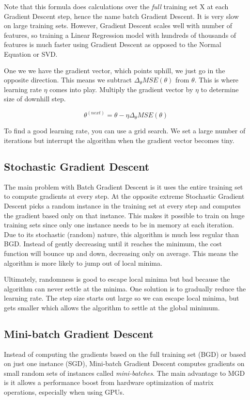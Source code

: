 \documentclass[letterpaper]{article}
\begin{document}
Note that this formula does calculations over the \textsl{full} training set X at each Gradient Descent step, hence the name batch Gradient Descent. It is very slow on large training sets. However, Gradient Descent scales well with number of features, so training a Linear Regression model with hundreds of thousands of features is much faster using Gradient Descent as opposed to the Normal Equation or SVD. 

One we we have the gradient vector, which points uphill, we just go in the opposite direction. This means we subtract $\Delta_{\theta} MSE (\theta)$ from $\theta$. This is where learning rate $\eta$ comes into play. Multiply the gradient vector by $\eta$ to determine size of downhill step. 

$$\theta^{(next)} = \theta - \eta\Delta_{\theta}MSE(\theta)$$ 

To find a good learning rate, you can use a grid search. We set a large number of iterations but interrupt the algorithm when the gradient vector becomes tiny. 

\subsection{Stochastic Gradient Descent}
The main problem with Batch Gradient Descent is it uses the entire training set to compute gradients at every step. At the opposite extreme Stochastic Gradient Descent picks a random instance in the training set at every step and computes the gradient based only on that instance. This makes it possible to train on huge training sets since only one instance needs to be in memory at each iteration. Due to its stochastic (random) nature, this algorithm is much less regular than BGD. Instead of gently decreasing until it reaches the minimum, the cost function will bounce up and down, decreasing only on average. This means the algorithm is more likely to jump out of local minima. 

Ultimately, randomness is good to escape local minima but bad because the algorithm can never settle at the minima. One solution is to gradually reduce the learning rate. The step size starts out large so we can escape local minima, but gets smaller which allows the algorithm to settle at the global minimum. 

\subsection{Mini-batch Gradient Descent}
Instead of computing the gradients based on the full training set (BGD) or based on just one instance (SGD), Mini-batch Gradient Descent computes gradients on small random sets of instances called \textsl{mini-batches}. The main advantage to MGD is it allows a performance boost from hardware optimization of matrix operations, especially when using GPUs. 
\end{document}
